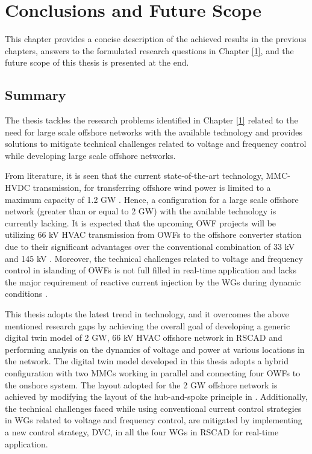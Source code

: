 \chapter{Conclusions and Future Scope}\label{6}

This chapter provides a concise description of the achieved results in the previous chapters, answers to the formulated research questions in Chapter \ref{1}, and the future scope of this thesis is presented at the end.

\section{Summary}
The thesis tackles the research problems identified in Chapter \ref{1} related to the need for large scale offshore networks with the available technology and provides solutions to mitigate technical challenges related to voltage and frequency control while developing large scale offshore networks.

From literature, it is seen that the current state-of-the-art technology, \gls{MMC}-\gls{HVDC} transmission, for transferring offshore wind power is limited to a maximum capacity of 1.2 GW \cite{peralta2012detailed}. Hence, a configuration for a large scale offshore network (greater than or equal to 2 GW) with the available technology is currently lacking. It is expected that the upcoming \gls{OWF} projects will be utilizing 66 kV \gls{HVAC} transmission from \gls{OWF}s to the offshore converter station due to their significant advantages over the conventional combination of 33 kV and 145 kV \cite{dnv66kv}. Moreover, the technical challenges related to voltage and frequency control in islanding of \gls{OWF}s is not full filled in real-time application and lacks the major requirement of reactive current injection by the \gls{WG}s during dynamic conditions \cite{sethi_real-time_nodate-new}.

This thesis adopts the latest trend in technology, and it overcomes the above mentioned research gaps by achieving the overall goal of developing a generic digital twin model of 2 GW, 66 kV \gls{HVAC} offshore network in RSCAD and performing analysis on the dynamics of voltage and power at various locations in the network. The digital twin model developed in this thesis adopts a hybrid configuration with two \gls{MMC}s working in parallel and connecting four \gls{OWF}s to the onshore system. The layout adopted for the 2 GW offshore network is achieved by modifying the layout of the hub-and-spoke principle in \cite{abb_hvdc_2018}. Additionally, the technical challenges faced while using conventional current control strategies in \gls{WG}s related to voltage and frequency control, are mitigated by implementing a new control strategy, \gls{DVC}, in all the four \gls{WG}s in RSCAD for real-time application. 

